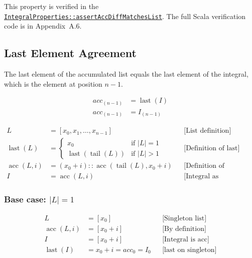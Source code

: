 {\raggedright
This property is verified in the
\href{https://github.com/thiagomata/prime-numbers/blob/master/src/main/scala/v1/chapter3/list/integral/properties/IntegralProperties.scala}{\texttt{IntegralProperties::\allowbreak assertAccDiffMatchesList}}.
The full Scala verification code is in Appendix~A.6.
\par}

\subsection{Last Element Agreement}
\label{sec:last-element-agreement}

The last element of the accumulated list equals the last element of the
integral, which is the element at position $n-1$.

\begin{equation*}
\begin{aligned}
acc_{(n - 1)} & = \operatorname{last}(I) \\
acc_{(n - 1)} & = I_{(n - 1)}
\end{aligned}
\end{equation*}

\begin{equation*}
\begin{aligned}
L &= [x_0, x_1, \dots, x_{n-1}]
  && \text{[List definition]} \\
\operatorname{last}(L) &=
  \begin{cases}
  x_0 & \text{if } \lvert L\rvert = 1 \\
  \operatorname{last}(\operatorname{tail}(L)) & \text{if } \lvert L\rvert > 1
  \end{cases}
  && \text{[Definition of last]} \\
\operatorname{acc}(L, i) &= (x_0 + i) :: \operatorname{acc}(\operatorname{tail}(L), x_0 + i)
  && \text{[Definition of accumulation]} \\
I &= \operatorname{acc}(L, i)
  && \text{[Integral as accumulated list]}
\end{aligned}
\end{equation*}

\subsubsection*{Base case: $\lvert L\rvert = 1$}

\begin{equation*}
\begin{aligned}
L &= [x_0]
  && \text{[Singleton list]} \\
\operatorname{acc}(L, i) &= [x_0 + i]
  && \text{[By definition]} \\
I &= [x_0 + i]
  && \text{[Integral is acc]} \\
\operatorname{last}(I) &= x_0 + i = acc_0 = I_0
  && \text{[last on singleton]}
\end{aligned}
\end{equation*}

